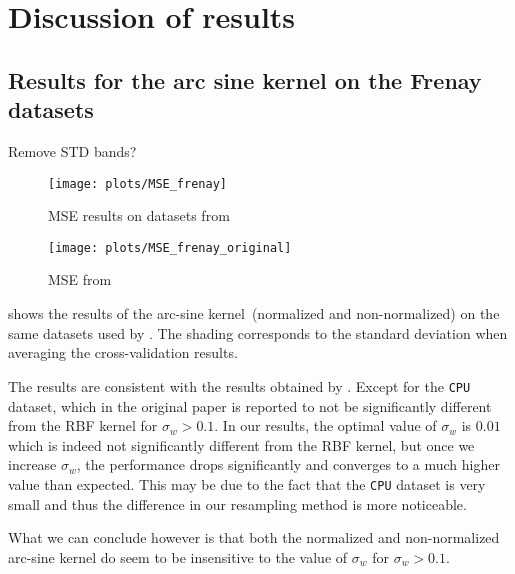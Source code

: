 \chapter{Discussion of results}
\label{sec:analysis}

\section{Results for the arc sine kernel on the Frenay datasets}

\begin{important}
    Remove STD bands?
\end{important}
\begin{figure}[H]
    \texttt{[image: plots/MSE\_frenay]}
    \caption{MSE results on datasets from \cite{frenayParameterinsensitiveKernelExtreme2011}}
    \label{fig:mse-frenay}
\end{figure}

\begin{figure}[H]
    \texttt{[image: plots/MSE\_frenay\_original]}
    \caption{MSE from \cite{frenayParameterinsensitiveKernelExtreme2011}}
    \label{fig:mse-frenay-original}
\end{figure}

 shows the results of the arc-sine
kernel~(normalized and non-normalized) on the same datasets used by \textcite{frenayParameterinsensitiveKernelExtreme2011}. The shading corresponds to the standard deviation when averaging the
cross-validation results.

The results are consistent with the results obtained by \citeauthor{frenayParameterinsensitiveKernelExtreme2011}.
Except for the \texttt{CPU} dataset, which in the original paper is reported to
not be significantly different from the RBF kernel for $\sigma_w > 0.1$. In
our results, the optimal value of $\sigma_w$ is $0.01$ which is indeed not
significantly different from the RBF kernel, but once we increase $\sigma_w$,
the performance drops significantly and converges to a much higher value than
expected. This may be due to the fact that the \texttt{CPU} dataset is very
small and thus the difference in our resampling method is more noticeable.

What we can conclude however is that both the normalized and non-normalized
arc-sine kernel do seem to be insensitive to the value of $\sigma_w$ for
$\sigma_w > 0.1$.

